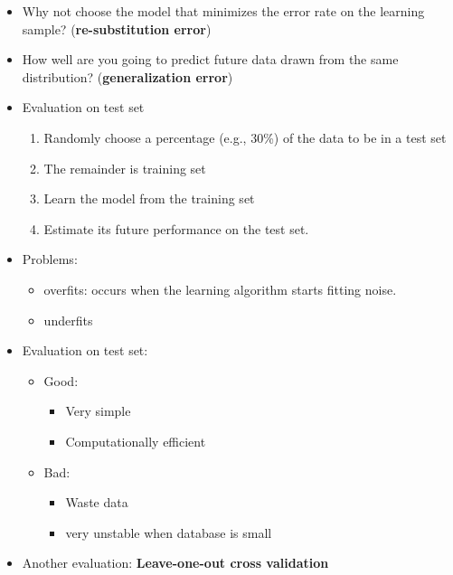 \documentclass[
]{book}
\providecommand{\tightlist}{%
  \setlength{\itemsep}{0pt}\setlength{\parskip}{0pt}}
\begin{document}
\begin{itemize}
\item
  Why not choose the model that minimizes the error rate on the learning sample? (\textbf{re-substitution error})
\item
  How well are you going to predict future data drawn from the same distribution? (\textbf{generalization error})
\item
  Evaluation on test set

  \begin{enumerate}
  \def\labelenumi{\arabic{enumi}.}
  \tightlist
  \item
    Randomly choose a percentage (e.g., 30\%) of the data to be in a test set
  \item
    The remainder is training set
  \item
    Learn the model from the training set
  \item
    Estimate its future performance on the test set.
  \end{enumerate}
\item
  Problems:

  \begin{itemize}
  \tightlist
  \item
    overfits: occurs when the learning algorithm starts fitting noise.
  \item
    underfits
  \end{itemize}
\item
  Evaluation on test set:

  \begin{itemize}
  \item
    Good:

    \begin{itemize}
    \tightlist
    \item
      Very simple
    \item
      Computationally efficient
    \end{itemize}
  \item
    Bad:

    \begin{itemize}
    \tightlist
    \item
      Waste data
    \item
      very unstable when database is small
    \end{itemize}
  \end{itemize}
\item
  Another evaluation: \textbf{Leave-one-out cross validation}


\end{itemize}
\end{document}
